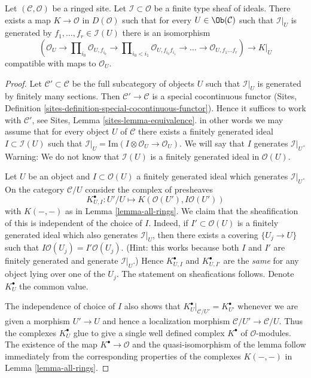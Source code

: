 \begin{lemma}
\label{lemma-global-extended-cech-complex}
Let $(\mathcal{C}, \mathcal{O})$ be a ringed site. Let
$\mathcal{I} \subset \mathcal{O}$ be a finite type sheaf of ideals.
There exists a map $K \to \mathcal{O}$ in $D(\mathcal{O})$
such that for every $U \in \Ob(\mathcal{C})$ such that
$\mathcal{I}|_U$ is generated by $f_1, \ldots, f_r \in \mathcal{I}(U)$
there is an isomorphism
$$
(\mathcal{O}_U \to \prod\nolimits_{i_0} \mathcal{O}_{U, f_{i_0}} \to
\prod\nolimits_{i_0 < i_1} \mathcal{O}_{U, f_{i_0}f_{i_1}} \to
\ldots \to \mathcal{O}_{U, f_1\ldots f_r}) \longrightarrow K|_U
$$
compatible with maps to $\mathcal{O}_U$.
\end{lemma}

\begin{proof}
Let $\mathcal{C}' \subset \mathcal{C}$ be the full subcategory
of objects $U$ such that $\mathcal{I}|_U$ is generated by
finitely many sections. Then $\mathcal{C}' \to \mathcal{C}$
is a special cocontinuous functor
(Sites, Definition \ref{sites-definition-special-cocontinuous-functor}).
Hence it suffices to work with $\mathcal{C}'$, see
Sites, Lemma \ref{sites-lemma-equivalence}.
in other words we may assume that for every
object $U$ of $\mathcal{C}$ there exists a finitely generated
ideal $I \subset \mathcal{I}(U)$ such that
$\mathcal{I}|_U = \text{Im}(I \otimes \mathcal{O}_U \to \mathcal{O}_U)$.
We will say that $I$ generates $\mathcal{I}|_U$.
Warning: We do not know that $\mathcal{I}(U)$ is a finitely generated
ideal in $\mathcal{O}(U)$.

\medskip\noindent
Let $U$ be an object and $I \subset \mathcal{O}(U)$ a finitely
generated ideal which generates $\mathcal{I}|_U$.
On the category $\mathcal{C}/U$ consider the complex of presheaves
$$
K_{U, I}^\bullet : U'/U \longmapsto K(\mathcal{O}(U'), I\mathcal{O}(U'))
$$
with $K(-, -)$ as in Lemma \ref{lemma-all-rings}.
We claim that the sheafification of this is independent of
the choice of $I$. Indeed, if $I' \subset \mathcal{O}(U)$
is a finitely generated ideal which also generates $\mathcal{I}|_U$, then
there exists a covering $\{U_j \to U\}$ such that
$I\mathcal{O}(U_j) = I'\mathcal{O}(U_j)$. (Hint: this works because
both $I$ and $I'$ are finitely generated and generate $\mathcal{I}|_U$.)
Hence $K_{U, I}^\bullet$ and $K_{U, I'}^\bullet$ are the {\it same}
for any object lying over one of the $U_j$. The statement
on sheafications follows. Denote $K_U^\bullet$ the common value.

\medskip\noindent
The independence of choice of $I$ also shows that
$K_U^\bullet|_{\mathcal{C}/U'} = K_{U'}^\bullet$
whenever we are given a morphism
$U' \to U$ and hence a localization morphism
$\mathcal{C}/U' \to \mathcal{C}/U$. Thus the complexes
$K_U^\bullet$ glue to give a single well defined complex $K^\bullet$
of $\mathcal{O}$-modules. The existence of the map $K^\bullet \to \mathcal{O}$
and the quasi-isomorphism of the lemma follow immediately from
the corresponding properties of the complexes $K(-, -)$ in
Lemma \ref{lemma-all-rings}.
\end{proof}


